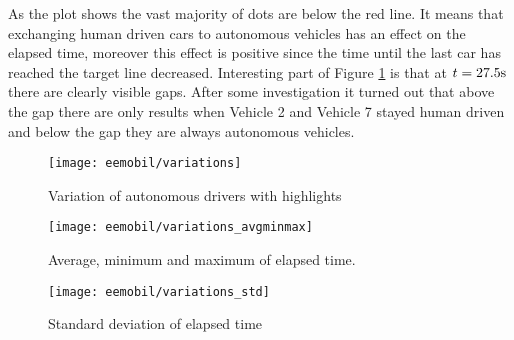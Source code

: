 		As the plot shows the vast majority of dots are below the red line. It means that exchanging human driven cars to autonomous vehicles has an effect on the elapsed time, moreover this effect is positive since the time until the last car has reached the target line decreased. Interesting part of Figure \ref{fig:self_variations} is that at $t=27.5\rm s$ there are clearly visible gaps. After some investigation it turned out that above the gap there are only results when Vehicle 2 and Vehicle 7 stayed human driven and below the gap they are always autonomous vehicles.
		\begin{figure}
			\centering
			\texttt{[image: eemobil/variations]}
			\caption{Variation of autonomous drivers with highlights}
			\label{fig:self_variations}
		\end{figure}
		\begin{figure}
			\centering
			\texttt{[image: eemobil/variations\_avgminmax]}
			\caption{Average, minimum and maximum of elapsed time.}
			\label{fig:self_variations_avgminmax}
		\end{figure}
		
		\begin{figure}
			\centering
			\texttt{[image: eemobil/variations\_std]}
			\caption{Standard deviation of elapsed time}
			\label{fig:self_variations_std}
		\end{figure}
